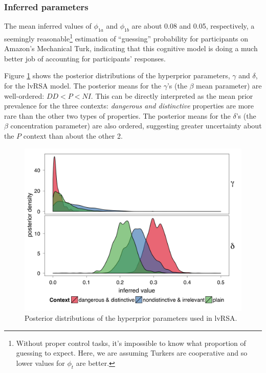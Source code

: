 \documentclass[10pt,letterpaper]{article}
\begin{document}
\subsubsection{Inferred parameters}
The mean inferred values of  $\phi_{1a}$ and $\phi_{1b}$ are about 0.08 and 0.05, respectively, a seemingly reasonable\footnote{Without proper control tasks, it's impossible to know what proportion of guessing to expect. Here, we are assuming Turkers are cooperative and so lower values for $\phi_{t}$ are better.} estimation of ``guessing'' probability for participants on Amazon's Mechanical Turk, indicating that this cognitive model is doing a much better job of accounting for participants' responses.

Figure \ref{fig:posthyper} shows the posterior distributions of the hyperprior parameters, $\gamma$ and $\delta$, for the lvRSA model. The posterior means for the $\gamma$'s (the $\beta$ mean parameter) are well-ordered: $DD < P < NI$. This can be directly interpreted as the mean prior prevalence for the three contexts: \emph{dangerous and distinctive} properties are more rare than the other two types of properties. The posterior means for the $\delta$'s (the $\beta$ concentration parameter) are also ordered, suggesting greater uncertainty about the $P$ context than about the other 2. 


\begin{figure}
  \begin{center}
    \includegraphics[width=0.48\columnwidth]{inferred_hyperpriors}
  \end{center}
  \caption{Posterior distributions of the hyperprior parameters used in lvRSA.}
   \label{fig:posthyper}
\end{figure}


\end{document}
